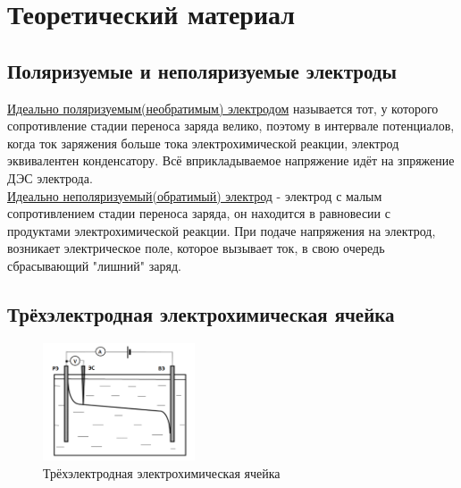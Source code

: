 \documentclass[a4paper,12pt]{article}
\begin{document}
\section{Теоретический материал}
\subsection{Поляризуемые и неполяризуемые электроды}
    
\underline{Идеально поляризуемым(необратимым) электродом} называется тот, у которого сопротивление стадии переноса заряда велико, поэтому в интервале потенциалов, когда ток заряжения больше тока электрохимической реакции, электрод эквивалентен конденсатору. Всё вприкладываемое напряжение идёт на зпряжение ДЭС электрода.\\
\underline{Идеально неполяризуемый(обратимый) электрод} - электрод с малым сопротивлением стадии переноса заряда, он находится в равновесии с продуктами электрохимической реакции. При подаче напряжения на электрод, возникает электрическое поле, которое вызывает ток, в свою очередь сбрасывающий "лишний" заряд. 
\subsection{Трёхэлектродная электрохимическая ячейка}
    
\begin{figure}[h!]
    \centering
    \includegraphics[width = 0.4\textwidth]{трёхЭ_схема.png}
    \caption{Трёхэлектродная электрохимическая ячейка}
    \label{fig:no_int}
\end{figure}\\
    
\end{document}
